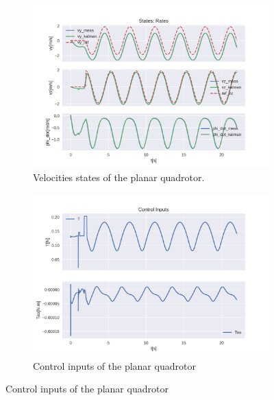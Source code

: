 \documentclass{thesisreport}
\begin{document}
\begin{figure}[H]
\medskip
	\begin{subfigure}{0.48\textwidth}
		\includegraphics[width=\linewidth]{Images/acados_simulations/circular_trajectory/planar_quadrotor/noisy/rateStates.png}
		\caption{Velocities states of the planar quadrotor.} \label{fig:planar_sim_velocities_noisy}
	\end{subfigure}\hspace*{\fill}
	\begin{subfigure}{0.48\textwidth}
		\includegraphics[width=\linewidth]{Images/acados_simulations/circular_trajectory/planar_quadrotor/noisy/controlInputs.png}
		\caption{Control inputs of the planar quadrotor} \label{fig:planar_sim_control_inputs_noisy}
	\end{subfigure}


\end{figure}
\end{document}
